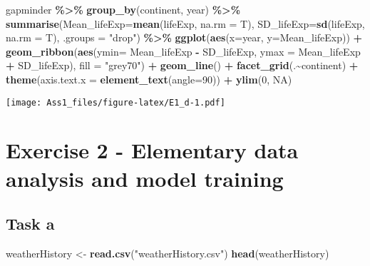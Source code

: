 \documentclass[
]{article}
\newenvironment{Shaded}{\begin{snugshade}}{\end{snugshade}}
\newcommand{\AttributeTok}[1]{\textcolor[rgb]{0.13,0.29,0.53}{#1}}
\newcommand{\ConstantTok}[1]{\textcolor[rgb]{0.56,0.35,0.01}{#1}}
\newcommand{\DecValTok}[1]{\textcolor[rgb]{0.00,0.00,0.81}{#1}}
\newcommand{\FunctionTok}[1]{\textcolor[rgb]{0.13,0.29,0.53}{\textbf{#1}}}
\newcommand{\NormalTok}[1]{#1}
\newcommand{\OtherTok}[1]{\textcolor[rgb]{0.56,0.35,0.01}{#1}}
\newcommand{\SpecialCharTok}[1]{\textcolor[rgb]{0.81,0.36,0.00}{\textbf{#1}}}
\newcommand{\StringTok}[1]{\textcolor[rgb]{0.31,0.60,0.02}{#1}}
\begin{document}
\begin{Shaded}
\begin{Highlighting}[]
\NormalTok{gapminder }\SpecialCharTok{\%\textgreater{}\%}
  \FunctionTok{group\_by}\NormalTok{(continent, year) }\SpecialCharTok{\%\textgreater{}\%}
  \FunctionTok{summarise}\NormalTok{(}\AttributeTok{Mean\_lifeExp=}\FunctionTok{mean}\NormalTok{(lifeExp, }\AttributeTok{na.rm =}\NormalTok{ T), }\AttributeTok{SD\_lifeExp=}\FunctionTok{sd}\NormalTok{(lifeExp, }\AttributeTok{na.rm =}\NormalTok{ T), }\AttributeTok{.groups =} \StringTok{"drop"}\NormalTok{) }\SpecialCharTok{\%\textgreater{}\%}
  \FunctionTok{ggplot}\NormalTok{(}\FunctionTok{aes}\NormalTok{(}\AttributeTok{x=}\NormalTok{year, }\AttributeTok{y=}\NormalTok{Mean\_lifeExp)) }\SpecialCharTok{+}
  \FunctionTok{geom\_ribbon}\NormalTok{(}\FunctionTok{aes}\NormalTok{(}\AttributeTok{ymin=}\NormalTok{ Mean\_lifeExp }\SpecialCharTok{{-}}\NormalTok{ SD\_lifeExp, }\AttributeTok{ymax =}\NormalTok{ Mean\_lifeExp }\SpecialCharTok{+}\NormalTok{ SD\_lifeExp), }\AttributeTok{fill =} \StringTok{"grey70"}\NormalTok{) }\SpecialCharTok{+}
  \FunctionTok{geom\_line}\NormalTok{() }\SpecialCharTok{+}
  \FunctionTok{facet\_grid}\NormalTok{(.}\SpecialCharTok{\textasciitilde{}}\NormalTok{continent) }\SpecialCharTok{+}
  \FunctionTok{theme}\NormalTok{(}\AttributeTok{axis.text.x =} \FunctionTok{element\_text}\NormalTok{(}\AttributeTok{angle=}\DecValTok{90}\NormalTok{)) }\SpecialCharTok{+}
  \FunctionTok{ylim}\NormalTok{(}\DecValTok{0}\NormalTok{, }\ConstantTok{NA}\NormalTok{)}
\end{Highlighting}
\end{Shaded}

\texttt{[image: Ass1\_files/figure-latex/E1\_d-1.pdf]}

\section{Exercise 2 - Elementary data analysis and model
training}\label{exercise-2---elementary-data-analysis-and-model-training}

\subsection{Task a}\label{task-a-1}

\begin{Shaded}
\begin{Highlighting}[]
\NormalTok{weatherHistory }\OtherTok{\textless{}{-}} \FunctionTok{read.csv}\NormalTok{(}\StringTok{"weatherHistory.csv"}\NormalTok{)}
\FunctionTok{head}\NormalTok{(weatherHistory)}
\end{Highlighting}
\end{Shaded}
\end{document}
